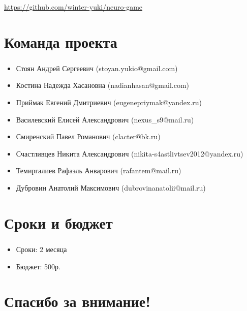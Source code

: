 \documentclass[c]{beamer}  %
\begin{document}
    

\begin{frame}
    
    \vspace{5ex}
    \url{https://github.com/winter-yuki/neuro-game} 
\end{frame}


\section{Команда проекта}

\begin{frame}
\frametitle{\insertsection} 
\begin{itemize}
    \item Стоян Андрей Сергеевич (stoyan.yukio@gmail.com)
    \item Костина Надежда Хасановна (nadianhasan@gmail.com)
    \item Приймак Евгений Дмитриевич (eugenepriymak@yandex.ru)
    \item Василевский Елисей Александрович (nexus\_s9@mail.ru)
    \item Смиренский Павел Романович (clacter@bk.ru)
    \item Счастливцев Никита Александрович (nikita-s4astlivtsev2012@yandex.ru)
    \item Темиргалиев Рафаэль Анварович (rafantem@mail.ru)
    \item Дубровин Анатолий Максимович (dubrovinanatolii@mail.ru)
\end{itemize}
\end{frame}










\section{Сроки и бюджет}

\begin{frame}
\frametitle{\insertsection} 
\framesubtitle{\insertsubsection}
\begin{itemize}
    \item Сроки: 2 месяца
    \item Бюджет: 500р.
\end{itemize}
\end{frame}


\section{Спасибо за внимание!}

\begin{frame}
\end{frame}
\end{document}
